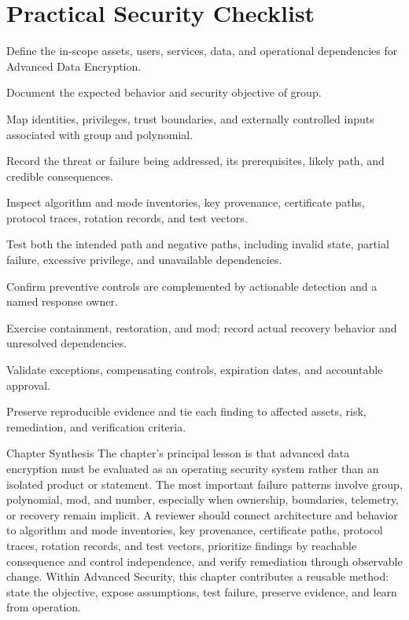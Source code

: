 \documentclass[11pt,letterpaper]{article}
\begin{document}
\section*{Practical Security Checklist}
\begin{CornellChecklist}
\item Define the in-scope assets, users, services, data, and operational dependencies for Advanced Data Encryption.
\item Document the expected behavior and security objective of group.
\item Map identities, privileges, trust boundaries, and externally controlled inputs associated with group and polynomial.
\item Record the threat or failure being addressed, its prerequisites, likely path, and credible consequences.
\item Inspect algorithm and mode inventories, key provenance, certificate paths, protocol traces, rotation records, and test vectors.
\item Test both the intended path and negative paths, including invalid state, partial failure, excessive privilege, and unavailable dependencies.
\item Confirm preventive controls are complemented by actionable detection and a named response owner.
\item Exercise containment, restoration, and mod; record actual recovery behavior and unresolved dependencies.
\item Validate exceptions, compensating controls, expiration dates, and accountable approval.
\item Preserve reproducible evidence and tie each finding to affected assets, risk, remediation, and verification criteria.
\end{CornellChecklist}
\begin{CornellSummaryBox}{Chapter Synthesis}
The chapter's principal lesson is that advanced data encryption must be evaluated as an operating security system rather than an isolated product or statement. The most important failure patterns involve group, polynomial, mod, and number, especially when ownership, boundaries, telemetry, or recovery remain implicit. A reviewer should connect architecture and behavior to algorithm and mode inventories, key provenance, certificate paths, protocol traces, rotation records, and test vectors, prioritize findings by reachable consequence and control independence, and verify remediation through observable change. Within Advanced Security, this chapter contributes a reusable method: state the objective, expose assumptions, test failure, preserve evidence, and learn from operation.
\end{CornellSummaryBox}
\end{document}

